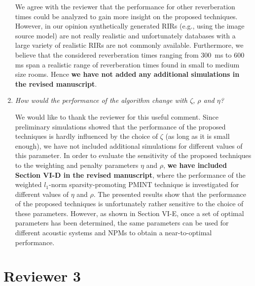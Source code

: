 \documentclass[9pt, a4paper]{article}
\begin{document}
\begin{enumerate}
We agree with the reviewer that the performance for other reverberation times could be analyzed to gain more insight on the proposed techniques.
However, in our opinion synthetically generated RIRs (e.g., using the image source model) are not really realistic and unfortunately databases with a large variety of realistic RIRs are not commonly available.
Furthermore, we believe that the considered reverberation times ranging from $300$~ms to $600$ ms span a realistic range of reverberation times found in small to medium size rooms.
Hence {\textbf{we have not added any additional simulations in the revised manuscript}}.

\newpage

\item {\textit{How would the performance of the algorithm change with $\zeta$, $\rho$ and $\eta$? }}

  We would like to thank the reviewer for this useful comment.
  Since preliminary simulations showed that the performance of the proposed techniques is hardly influenced by the choice of $\zeta$ (as long as it is small enough), we have not included additional simulations for different values of this parameter. 
  In order to evaluate the sensitivity of the proposed techniques to the weighting and penalty parameters $\eta$ and $\rho$, {\textbf{we have included Section VI-D in the revised manuscript}}, where the performance of the weighted $l_1$-norm sparsity-promoting PMINT technique is investigated for different values of $\eta$ and $\rho$.
  The presented results show that the performance of the proposed techniques is unfortunately rather sensitive to the choice of these parameters.
  However, as shown in Section VI-E, once a set of optimal parameters has been determined, the same parameters can be used for different acoustic systems and NPMs to obtain a near-to-optimal performance.
  
\end{enumerate}

\section{Reviewer 3}
\end{document}
